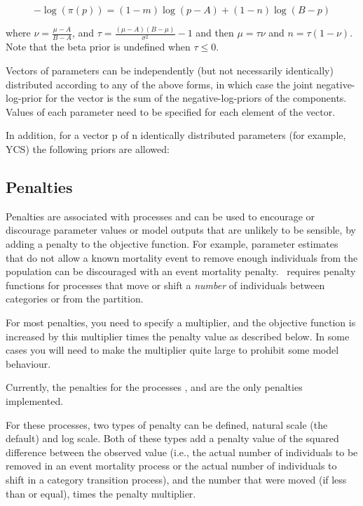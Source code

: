 \begin{enumerate}
\begin{equation}
 - \log \left(\pi \left( p \right) \right) = \left( 1 - m \right) \log \left( p - A \right) + \left( 1 - n \right)\log \left( B - p \right)
\end{equation}

where $\nu  = \frac{\mu  - A}{B - A}$, and $\tau = \frac{\left(\mu -A \right)\left(B - \mu \right)}{\sigma ^2} - 1$ and then $\mu=\tau \nu$ and $n=\tau(1-\nu)$. Note that the beta prior is undefined when $\tau \leq 0$.

\end{enumerate}

Vectors of parameters can be independently (but not necessarily identically) distributed according to any of the above forms, in which case the joint negative-log-prior for the vector is the sum of the negative-log-priors of the components. Values of each parameter need to be specified for each element of the vector. 

In addition, for a vector p of n identically distributed parameters (for example, YCS) the following priors are allowed: 

\subsection{Penalties\label{sec:penalties}}
Penalties are associated with processes and can be used to encourage or discourage parameter values or model outputs that are unlikely to be sensible, by adding a penalty to the objective function. For example, parameter estimates that do not allow a known mortality event to remove enough individuals from the population can be discouraged with an event mortality penalty. \CNAME\ requires penalty functions for processes that move or shift a \emph{number} of individuals between categories or from the partition.

For most penalties, you need to specify a multiplier, and the objective function is increased by this multiplier times the penalty value as described below. In some cases you will need to make the multiplier quite large to prohibit some model behaviour. 

Currently, the penalties for the processes ,  and  are the only penalties implemented. 

For these processes, two types of penalty can be defined, natural scale (the default) and log scale. Both of these types add a penalty value of the squared difference between the observed value (i.e., the actual number of individuals to be removed in an event mortality process or the actual number of individuals to shift in a category transition process), and the number that were moved (if less than or equal), times the penalty multiplier.

